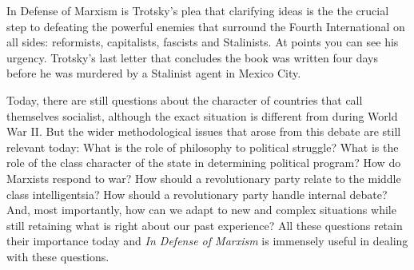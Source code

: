 In Defense of Marxism is Trotsky’s plea that clarifying ideas is the the crucial step to defeating the powerful enemies that surround the Fourth International on all sides: reformists, capitalists, fascists and Stalinists. At points you can see his urgency. Trotsky’s last letter that concludes the book was written four days before he was murdered by a Stalinist agent in Mexico City.

Today, there are still questions about the character of countries that call themselves socialist, although the exact situation is different from during World War II. But the wider methodological issues that arose from this debate are still relevant today: What is the role of philosophy to political struggle? What is the role of the class character of the state in determining political program? How do Marxists respond to war? How should a revolutionary party relate to the middle class intelligentsia? How should a revolutionary party handle internal debate? And, most importantly, how can we adapt to new and complex situations while still retaining what is right about our past experience? All these questions retain their importance today and \emph{In Defense of Marxism} is immensely useful in dealing with these questions.

